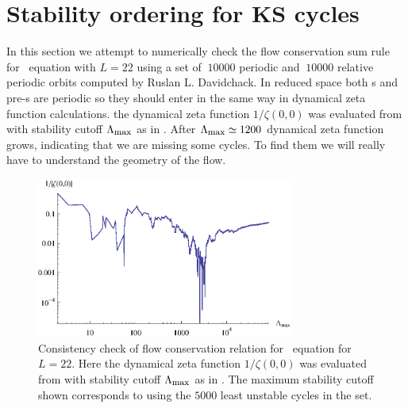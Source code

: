 \section{Stability ordering for KS cycles}
\label{s-StOrdKS}

In this section we attempt to numerically check the
flow conservation sum rule  for \KS\ equation with $L=22$
using a set of $~10000$ periodic and $~10000$ relative
periodic orbits  computed by Ruslan L. Davidchack.
In reduced space both \rpo s and pre-\po s are periodic so they should
enter in the same way in dynamical zeta function calculations. the dynamical zeta function $1/\zeta(0,0)$ was evaluated
from  with stability cutoff $\Lambda_{\mbox{\footnotesize max}}$ as
in . After $\Lambda_{\mbox{\footnotesize max}}\simeq1200$
dynamical zeta function grows, indicating that we are missing some cycles.
To find them we will really have to understand the geometry of the flow.

\begin{figure}
    \vspace*{-5pt}
\begin{center}
	\includegraphics[width=0.75\textwidth]{../figs/ksStabOrder5000}
\end{center}
\caption[Flow conservation for \KS, $L=22$]
    {
Consistency check of flow conservation relation 
for \KS\ equation  for $L=22$.
Here the dynamical zeta function $1/\zeta(0,0)$ was evaluated
from  with stability cutoff $\Lambda_{\mbox{\footnotesize max}}$ as
in . The maximum stability cutoff shown corresponds
to using the $5000$ least unstable cycles in the set.
	}
\label{fig:zetaStabOrderKS22}
    \vspace*{-5pt}
\end{figure}



